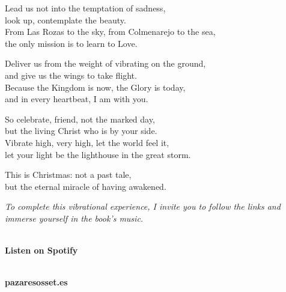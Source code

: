 {\bigskip\bigskip

Lead us not into the temptation of sadness, \\
look up, contemplate the beauty. \\
From Las Rozas to the sky, from Colmenarejo to the sea, \\
the only mission is to learn to Love.

\bigskip\bigskip

Deliver us from the weight of vibrating on the ground, \\
and give us the wings to take flight. \\
Because the Kingdom is now, the Glory is today, \\
and in every heartbeat, I am with you.

\bigskip\bigskip

So celebrate, friend, not the marked day, \\
but the living Christ who is by your side. \\
Vibrate high, very high, let the world feel it, \\
let your light be the lighthouse in the great storm.

\bigskip\bigskip

This is Christmas: not a past tale, \\
but the eternal miracle of having awakened.
\par}


\vspace{1.5cm}
\begin{center}
\textit{To complete this vibrational experience, I invite you to follow the links and immerse yourself in the book's music.}\\
\vspace{1cm}
\begin{minipage}{0.45\textwidth}
\centering
{}\\
\vspace{0.4cm}\textbf{Listen on Spotify}
\end{minipage}\hfill
\begin{minipage}{0.45\textwidth}
\centering
{}\\
\vspace{0.4cm}\textbf{pazaresosset.es}
\end{minipage}
\end{center}